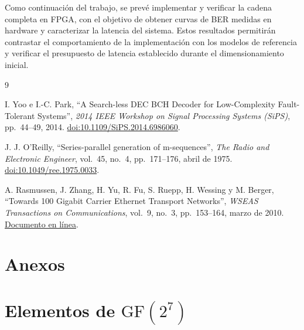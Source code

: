 \documentclass[10pt,a4paper]{article}
\begin{document}
Como continuación del trabajo, se prevé implementar y verificar
la cadena completa en FPGA, con el objetivo de obtener curvas
de BER medidas en hardware y caracterizar la latencia del sistema.
Estos resultados permitirán contrastar el comportamiento de la
implementación con los modelos de referencia y verificar el
presupuesto de latencia establecido durante el dimensionamiento
inicial.

\clearpage
{}
{}
\begin{thebibliography}{9}

I. Yoo e I.-C. Park,
``A Search-less DEC BCH Decoder for Low-Complexity Fault-Tolerant Systems'',
\textit{2014 IEEE Workshop on Signal Processing Systems (SiPS)},
pp.~44--49, 2014.
\href{https://doi.org/10.1109/SiPS.2014.6986060}{doi:10.1109/SiPS.2014.6986060}.

J. J. O'Reilly,
``Series-parallel generation of m-sequences'',
\textit{The Radio and Electronic Engineer},
vol.~45, no.~4, pp.~171--176, abril de 1975.
\href{https://doi.org/10.1049/ree.1975.0033}{doi:10.1049/ree.1975.0033}.

A. Rasmussen, J. Zhang, H. Yu, R. Fu, S. Ruepp, H. Wessing y M. Berger,
``Towards 100 Gigabit Carrier Ethernet Transport Networks'',
\textit{WSEAS Transactions on Communications},
vol.~9, no.~3, pp.~153--164, marzo de 2010.
\href{https://www.wseas.us/e-library/transactions/communications/2010/89-424.pdf}{Documento en línea}.

\end{thebibliography}

\clearpage
{}
\section*{Anexos}
\appendix
\makeatletter
{}
\makeatother
\renewcommand{\thetable}{\arabic{table}}
\renewcommand{\theHtable}{\thesection.\arabic{table}}

\section{Elementos de \texorpdfstring{$\mathrm{GF}(2^7)$}{GF(2 elevado a 7)}}
\label{anexo:elementos-gf27}
\end{document}
